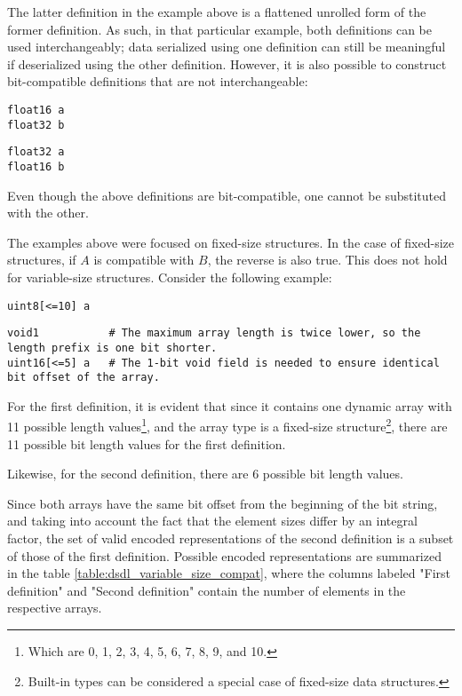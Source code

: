 The latter definition in the example above is a flattened unrolled form of the former definition.
As such, in that particular example, both definitions can be used interchangeably;
data serialized using one definition can still be meaningful if deserialized using the other definition.
However, it is also possible to construct bit-compatible definitions that are not interchangeable:

\begin{verbatim}
float16 a
float32 b
\end{verbatim}

\begin{verbatim}
float32 a
float16 b
\end{verbatim}

Even though the above definitions are bit-compatible, one cannot be substituted with the other.

The examples above were focused on fixed-size structures.
In the case of fixed-size structures, if $A$ is compatible with $B$, the reverse is also true.
This does not hold for variable-size structures.
Consider the following example:

\begin{verbatim}
uint8[<=10] a
\end{verbatim}

\begin{verbatim}
void1           # The maximum array length is twice lower, so the length prefix is one bit shorter.
uint16[<=5] a   # The 1-bit void field is needed to ensure identical bit offset of the array.
\end{verbatim}

For the first definition, it is evident that since it contains one dynamic array with
11 possible length values\footnote{Which are 0, 1, 2, 3, 4, 5, 6, 7, 8, 9, and 10.},
and the array type is a fixed-size
structure\footnote{Built-in types can be considered a special case of fixed-size data structures.},
there are 11 possible bit length values for the first definition.

Likewise, for the second definition, there are 6 possible bit length values.

Since both arrays have the same bit offset from the beginning of the bit string,
and taking into account the fact that the element sizes differ by an integral factor,
the set of valid encoded representations of the second definition is a subset of those of the first definition.
Possible encoded representations are summarized in the table \ref{table:dsdl_variable_size_compat},
where the columns labeled "First definition" and "Second definition" contain the number of elements in the
respective arrays.

